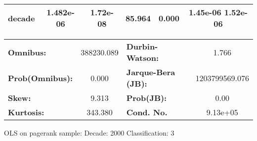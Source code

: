 \begin{center}
\begin{tabular}{lccccc}
\textbf{decade}             &    1.482e-06  &     1.72e-08     &    85.964  &         0.000        &      1.45e-06  1.52e-06       \\
\bottomrule
\end{tabular}
\begin{tabular}{lclc}
\textbf{Omnibus:}       & 388230.089 & \textbf{  Durbin-Watson:     } &       1.766     \\
\textbf{Prob(Omnibus):} &    0.000   & \textbf{  Jarque-Bera (JB):  } & 1203799569.076  \\
\textbf{Skew:}          &    9.313   & \textbf{  Prob(JB):          } &        0.00     \\
\textbf{Kurtosis:}      &  343.380   & \textbf{  Cond. No.          } &    9.13e+05     \\
\bottomrule
\end{tabular}
\end{center}
\break
OLS on pagerank sample: Decade: 2000 Classification: 3

